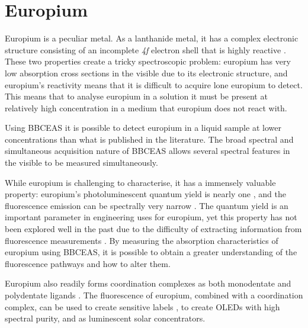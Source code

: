 \chapter{Europium}\label{ch:europium}

Europium is a peculiar metal. As a lanthanide metal, it has a complex
electronic structure consisting of an incomplete \textsl{4f} electron shell
that is highly reactive \cite{Cooley:1946tv,Rard:1985tb}. These two properties create a
tricky spectroscopic problem: europium has very low absorption cross sections
in the visible due to its electronic structure, and europium's reactivity means
that it is difficult to acquire lone europium to detect. This means that to
analyse europium in a solution it must be present at relatively high
concentration in a medium that europium does not react with.


Using \ac{BBCEAS} it is possible to detect europium in a liquid sample at lower
concentrations than what is published in the literature.  The broad spectral
and simultaneous acquisition nature of \ac{BBCEAS} allows several spectral
features in the visible to be measured simultaneously.

While europium is challenging to characterise, it has a immensely valuable
property: europium's photoluminescent quantum yield is nearly one
\cite{Scotognella:2009jo,Moudam:2009in, Bunzli:2005ic}, and the fluorescence
emission can be spectrally very narrow \cite{Werts:2002fs}. The quantum yield
is an important parameter in engineering uses for europium, yet this property
has not been explored well in the past due to the difficulty of extracting
information from fluorescence measurements \cite{Werts:2002fs}. By measuring
the absorption characteristics of europium using \ac{BBCEAS}, it is possible to
obtain a greater understanding of the fluorescence pathways and how to alter
them.

Europium also readily forms coordination complexes as both monodentate and
polydentate ligands
\cite{Kirby:1983cl,Sveshnikova:2000cr,Werts:2002fs,Bunzli:2005ic,Scotognella:2009jo,Moudam:2009in}. The fluorescence of europium, combined with a coordination complex, can be used
to create sensitive labels
\cite{Harma:2010dm,Pihlasalo:2010el,InstituteofBiomedicine:2011vt,Pihlasalo:2011ju,Pihlasalo:2012cq,Pihlasalo:2012en},
to create OLEDs with high spectral purity\cite{Moudam:2009in}, and as
luminescent solar concentrators\cite{Moudam:2009in,Wilson:2010hs}.

